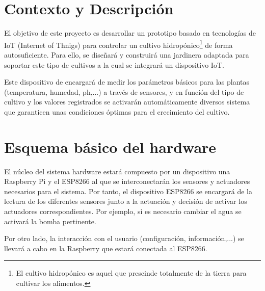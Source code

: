 \documentclass[12pt,a4paper,titlepage,oneside]{report}
\title{\titulo}
\author{\autor}
\begin{document}



\tableofcontents
\listoffigures

\chapter{Contexto y Descripción}
	El objetivo de este proyecto es desarrollar un prototipo basado en tecnologías de IoT (Internet of Thnigs) para controlar un cultivo hidropónico\footnote[1]{El cultivo hidropónico es aquel que prescinde totalmente de la tierra para cultivar los alimentos.\cite{ecoinventos_2019}} de forma autosuficiente. Para ello, se diseñará y construirá una jardinera adaptada para soportar este tipo de cultivos a la cual se integrará un  dispositivo IoT. 


	Este dispositivo de encargará de medir los parámetros básicos para las plantas (temperatura, humedad, ph,...) a través de sensores, y en función del tipo de cultivo y los valores registrados se activarán automáticamente diversos sistema que garanticen unas condiciones óptimas para el crecimiento del cultivo.



\chapter{Esquema básico del hardware}

	El núcleo del sistema hardware estará compuesto por un dispositivo una Raspberry Pi y el ESP8266 al que se interconectarán los sensores y actuadores necesarios para el sistema. Por tanto, el dispositivo ESP8266 se encargará de la lectura de los diferentes sensores junto a la actuación y decisión de activar los actuadores correspondientes. Por ejemplo, si es necesario cambiar el agua se activará la bomba pertinente.

	Por otro lado, la interacción con el usuario (configuración, información,...) se llevará a cabo en la Raspberry que estará conectada al ESP8266. \cite{ruiz}
	
\end{document}
